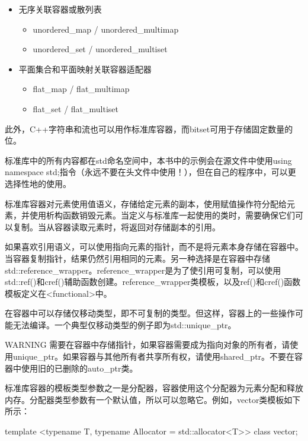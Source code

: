 \begin{itemize}
\item
无序关联容器或散列表
\begin{itemize}
\item
unordered\_map / unordered\_multimap

\item
unordered\_set / unordered\_multiset
\end{itemize}

\item
平面集合和平面映射关联容器适配器
\begin{itemize}
\item
flat\_map / flat\_multimap

\item
flat\_set / flat\_multiset
\end{itemize}
\end{itemize}

此外，C++字符串和流也可以用作标准库容器，而bitset可用于存储固定数量的位。

标准库中的所有内容都在std命名空间中，本书中的示例会在源文件中使用using namespace std;指令（永远不要在头文件中使用！），但在自己的程序中，可以更选择性地的使用。


标准库容器对元素使用值语义，存储给定元素的副本，使用赋值操作符分配给元素，并使用析构函数销毁元素。当定义与标准库一起使用的类时，需要确保它们可以复制。当从容器读取元素时，将返回对存储副本的引用。

如果喜欢引用语义，可以使用指向元素的指针，而不是将元素本身存储在容器中。当容器复制指针，结果仍然引用相同的元素。另一种选择是在容器中存储std::reference\_wrapper。reference\_wrapper是为了使引用可复制，可以使用std::ref()和cref()辅助函数创建。reference\_wrapper类模板，以及ref()和cref()函数模板定义在<functional>中。

在容器中可以存储仅移动类型，即不可复制的类型。但这样，容器上的一些操作可能无法编译。一个典型仅移动类型的例子即为std::unique\_ptr。

\begin{myWarning}{WARNING}
需要在容器中存储指针，如果容器需要成为指向对象的所有者，请使用unique\_ptr。如果容器与其他所有者共享所有权，请使用shared\_ptr。不要在容器中使用旧的已删除的auto\_ptr类。
\end{myWarning}

标准库容器的模板类型参数之一是分配器，容器使用这个分配器为元素分配和释放内存。分配器类型参数有一个默认值，所以可以忽略它。例如，vector类模板如下所示：

\begin{cpp}
template <typename T, typename Allocator = std::allocator<T>> class vector;
\end{cpp}


